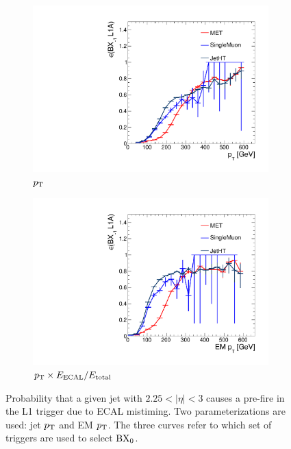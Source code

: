 \begin{figure}[]
    \begin{center}
        \begin{subfigure}[t]{0.49\textwidth}
            \includegraphics[width=\textwidth]{figures/vbf/triggers/oned_jotPt_finor_ratio.pdf}
            \caption{$p_\mathrm{T}$}
        \end{subfigure}
        \begin{subfigure}[t]{0.49\textwidth}
            \includegraphics[width=\textwidth]{figures/vbf/triggers/oned_jotEMPt_finor_ratio.pdf}
            \caption{$p_\mathrm{T} \times E_\mathrm{ECAL}/E_\mathrm{total}$}
        \end{subfigure}
        \caption{Probability that a given jet with $2.25<|\eta|<3$ causes a pre-fire in the L1 trigger due to ECAL mistiming.
                 Two parameterizations are used: jet $p_\mathrm{T}$ and EM $p_\mathrm{T}$.
                 The three curves refer to which set of triggers are used to select ${\mathrm{BX}_{0}}$.}
        \label{fig:vbf:pre_eff1}
    \end{center}
\end{figure}

